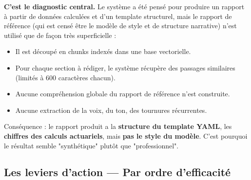 \documentclass[12pt,a4paper]{article}
\begin{document}
\begin{blockerbox}
\textbf{C'est le diagnostic central.} Le système a été pensé pour produire un rapport
à partir de données calculées et d'un template structurel, mais le rapport de
référence (qui est censé être le modèle de style et de structure narrative)
n'est utilisé que de façon très superficielle :

\begin{itemize}[leftmargin=1.5em]
  \item Il est découpé en chunks indexés dans une base vectorielle.
  \item Pour chaque section à rédiger, le système récupère des passages
        similaires (limités à 600 caractères chacun).
  \item Aucune compréhension globale du rapport de référence n'est construite.
  \item Aucune extraction de la voix, du ton, des tournures récurrentes.
\end{itemize}

Conséquence : le rapport produit a la \textbf{structure du template YAML}, les
\textbf{chiffres des calculs actuariels}, mais \textbf{pas le style du modèle}.
C'est pourquoi le résultat semble "synthétique" plutôt que "professionnel".
\end{blockerbox}

\subsection{Les leviers d'action — Par ordre d'efficacité}
\end{document}

